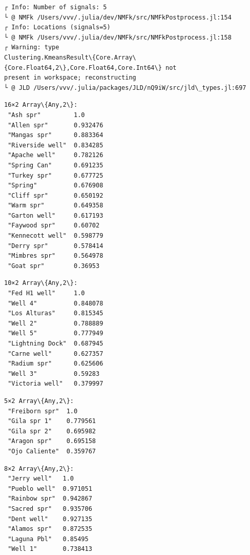 \documentclass[11pt]{article}
\begin{document}
    \begin{Verbatim}[commandchars=\\\{\}]
┌ Info: Number of signals: 5
└ @ NMFk /Users/vvv/.julia/dev/NMFk/src/NMFkPostprocess.jl:154
┌ Info: Locations (signals=5)
└ @ NMFk /Users/vvv/.julia/dev/NMFk/src/NMFkPostprocess.jl:158
┌ Warning: type
Clustering.KmeansResult\{Core.Array\{Core.Float64,2\},Core.Float64,Core.Int64\} not
present in workspace; reconstructing
└ @ JLD /Users/vvv/.julia/packages/JLD/nQ9iW/src/jld\_types.jl:697
    \end{Verbatim}


    \begin{Verbatim}[commandchars=\\\{\}]
16×2 Array\{Any,2\}:
 "Ash spr"         1.0
 "Allen spr"       0.932476
 "Mangas spr"      0.883364
 "Riverside well"  0.834285
 "Apache well"     0.782126
 "Spring Can"      0.691235
 "Turkey spr"      0.677725
 "Spring"          0.676908
 "Cliff spr"       0.650192
 "Warm spr"        0.649358
 "Garton well"     0.617193
 "Faywood spr"     0.60702
 "Kennecott well"  0.598779
 "Derry spr"       0.578414
 "Mimbres spr"     0.564978
 "Goat spr"        0.36953
    \end{Verbatim}



    \begin{Verbatim}[commandchars=\\\{\}]
10×2 Array\{Any,2\}:
 "Fed H1 well"     1.0
 "Well 4"          0.848078
 "Los Alturas"     0.815345
 "Well 2"          0.788889
 "Well 5"          0.777949
 "Lightning Dock"  0.687945
 "Carne well"      0.627357
 "Radium spr"      0.625606
 "Well 3"          0.59283
 "Victoria well"   0.379997
    \end{Verbatim}



    \begin{Verbatim}[commandchars=\\\{\}]
5×2 Array\{Any,2\}:
 "Freiborn spr"  1.0
 "Gila spr 1"    0.779561
 "Gila spr 2"    0.695982
 "Aragon spr"    0.695158
 "Ojo Caliente"  0.359767
    \end{Verbatim}



    \begin{Verbatim}[commandchars=\\\{\}]
8×2 Array\{Any,2\}:
 "Jerry well"   1.0
 "Pueblo well"  0.971051
 "Rainbow spr"  0.942867
 "Sacred spr"   0.935706
 "Dent well"    0.927135
 "Alamos spr"   0.872535
 "Laguna Pbl"   0.85495
 "Well 1"       0.738413
    \end{Verbatim}
\end{document}
